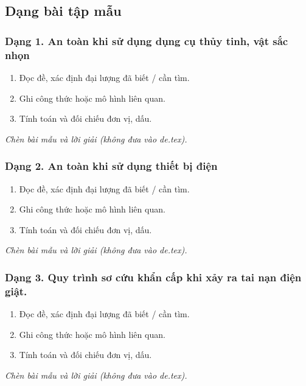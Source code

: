 

\subsection{Dạng bài tập mẫu}
\subsubsection{Dạng 1. An toàn khi sử dụng dụng cụ thủy tinh, vật sắc nhọn}
\begin{phuongphap}
\begin{enumerate}
\item Đọc đề, xác định đại lượng đã biết / cần tìm.
\item Ghi công thức hoặc mô hình liên quan.
\item Tính toán và đối chiếu đơn vị, dấu.
\end{enumerate}
\end{phuongphap}
\begin{vidumau}
\textit{Chèn bài mẫu và lời giải (không đưa vào de.tex).}
\end{vidumau}

\subsubsection{Dạng 2. An toàn khi sử dụng thiết bị điện}
\begin{phuongphap}
\begin{enumerate}
\item Đọc đề, xác định đại lượng đã biết / cần tìm.
\item Ghi công thức hoặc mô hình liên quan.
\item Tính toán và đối chiếu đơn vị, dấu.
\end{enumerate}
\end{phuongphap}
\begin{vidumau}
\textit{Chèn bài mẫu và lời giải (không đưa vào de.tex).}
\end{vidumau}

\subsubsection{Dạng 3. Quy trình sơ cứu khẩn cấp khi xảy ra tai nạn điện giật.}
\begin{phuongphap}
\begin{enumerate}
\item Đọc đề, xác định đại lượng đã biết / cần tìm.
\item Ghi công thức hoặc mô hình liên quan.
\item Tính toán và đối chiếu đơn vị, dấu.
\end{enumerate}
\end{phuongphap}
\begin{vidumau}
\textit{Chèn bài mẫu và lời giải (không đưa vào de.tex).}
\end{vidumau}

